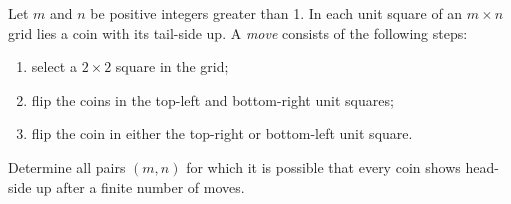 Let $m$ and $n$ be positive integers greater than 1. In each unit square of an $m \times n$ grid lies a coin with its tail-side up. A \emph{move} consists of the following steps:

\begin{enumerate}
\item select a $2 \times 2$ square in the grid;
\item flip the coins in the top-left and bottom-right unit squares;
\item flip the coin in either the top-right or bottom-left unit square.
\end{enumerate}

Determine all pairs $(m, n)$ for which it is possible that every coin shows head-side up after a finite number of moves.

